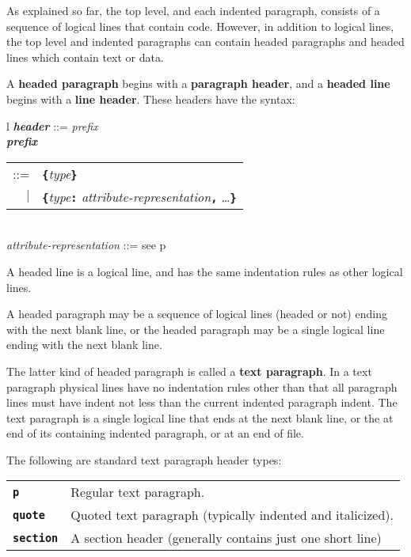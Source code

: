 \documentclass[12pt]{article}
\newcommand{\TT}[1]{{\tt \bfseries #1}}
\newcommand{\key}[1]{{\rm \bfseries #1}}
\newcommand{\ttkey}[1]{{\tt \bfseries #1}}
\newcommand{\emkey}[1]{{\em \bfseries #1}}
\newcommand{\pagref}[1]{p\pageref{#1}}
\newenvironment{indpar}[1][0.3in]%
	{\begin{list}{}%
		     {\setlength{\itemsep}{0in}%
		      \setlength{\topsep}{0in}%
		      \setlength{\parsep}{1ex}%
		      \setlength{\labelwidth}{#1}%
		      \setlength{\leftmargin}{#1}%
		      \addtolength{\leftmargin}{\labelsep}}%
	 \item}%
	{\end{list}}
\begin{document}
As explained so far, the top level, and each indented paragraph,
consists of a sequence of logical lines that contain code.
However, in addition to logical lines, the top level and indented
paragraphs can contain headed paragraphs
and headed lines which contain text or data.

A \key{headed paragraph} begins with a \key{paragraph header}, and
a \key{headed line} begins with a \key{line header}.  These headers
have the syntax:
\begin{indpar}
\begin{tabular}{l}
\emkey{header} ::= {\em prefix} \\
\emkey{prefix} \begin{tabular}[t]{rl}
               ::= & \TT{\{}{\em type}\TT{\}} \\
               $|$ & \TT{\{}{\em type}\TT{:}
	             {\em attribute-representation}\TT{,} \ldots\TT{\}}
	       \end{tabular} \\
{\em attribute-representation} ::= see \pagref{ATTRIBUTE-REPRESENTATION}
\end{tabular}
\end{indpar}

A headed line is a logical line, and has the same indentation rules
as other logical lines.

A headed paragraph may be a sequence of logical lines (headed or not)
ending with
the next blank line, or the headed paragraph may be a single logical
line ending with the next blank line.

The latter kind of headed paragraph
is called a \key{text paragraph}\label{TEXT-PARAGRAPH}.
In a text paragraph
physical lines have no indentation rules other than that all paragraph lines
must have indent not less than the current indented paragraph indent.
The text paragraph is a single logical line that
ends at the next blank line, or the at end of its
containing indented paragraph, or at an end of file.

The following are standard text paragraph header types:
\begin{center}
\begin{tabular}{lp{4in}}
\ttkey{p} & Regular text paragraph. \\
\ttkey{quote} & Quoted text paragraph (typically indented and italicized). \\
\ttkey{section} & A section header (generally contains just one short line) \\
\end{tabular}
\end{center}
\end{document}
